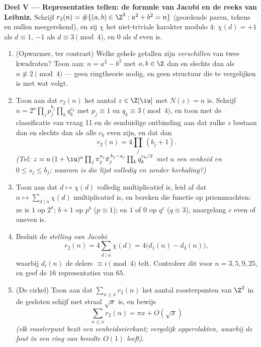 \begin{problem}
\medskip
\noindent\textbf{Deel V --- Representaties tellen: de formule van
Jacobi en de reeks van Leibniz.} Schrijf $r_2(n) = \#\{(a, b) \in
\Z^2 : a^2 + b^2 = n\}$ (geordende paren, tekens en nullen
meegerekend), en zij $\chi$ het niet-triviale karakter modulo $4$:
$\chi(d) = +1$ als $d \equiv 1$, $-1$ als $d \equiv 3 \pmod4$, en
$0$ als $d$ even is.
\begin{enumerate}[resume]
  \item (Opwarmer, ter contrast) Welke gehele getallen zijn
        \emph{verschillen} van twee kwadraten? Toon aan: $n = a^2 -
        b^2$ met $a, b \in \Z$ dan en slechts dan als $n
        \not\equiv 2 \pmod 4$ --- geen ringtheorie nodig, en geen
        structuur die te vergelijken is met wat volgt.
  \item Toon aan dat $r_2(n)$ het aantal $z \in \Z[\iu]$ met $N(z)
        = n$ is. Schrijf $n = 2^{a}\prod_jp_j^{b_j}
        \prod_kq_k^{c_k}$ met $p_j \equiv 1$ en $q_k \equiv 3
        \pmod4$, en toon met de classificatie van vraag 11 en de
        eenduidige ontbinding aan dat zulke $z$ bestaan dan en
        slechts dan als alle $c_k$ even zijn, en dat dan
        \[
        r_2(n) = 4\prod_j\,(b_j + 1) .
        \]
        \emph{(Tel: $z = u\,(1+\iu)^{a}\prod_j\pi_j^{s_j}
        \bar\pi_j^{\,b_j - s_j}\prod_kq_k^{c_k/2}$ met $u$ een
        eenheid en $0 \leq s_j \leq b_j$; waarom is die lijst
        volledig en zonder herhaling?)}
  \item Toon aan dat $d \mapsto \chi(d)$ volledig multiplicatief
        is, leid af dat $n \mapsto \sum_{d \mid n}\chi(d)$
        multiplicatief is, en bereken die functie op priemmachten:
        ze is $1$ op $2^a$; $b + 1$ op $p^b$ ($p \equiv 1$); en $1$
        of $0$ op $q^c$ ($q \equiv 3$), naargelang $c$ even of
        oneven is.
  \item Besluit de \emph{stelling van Jacobi}:
        \[
        r_2(n) = 4\sum_{d \mid n}\chi(d) =
        4\bigl(d_1(n) - d_3(n)\bigr),
        \]
        waarbij $d_i(n)$ de delers $\equiv i \pmod 4$ telt.
        Controleer dit voor $n = 3, 5, 9, 25$, en geef de $16$
        representaties van $65$.
  \item (De cirkel) Toon aan dat $\sum_{n \leq x}r_2(n)$ het aantal
        roosterpunten van $\Z^2$ in de gesloten schijf met straal
        $\sqrt x$ is, en bewijs
        \[
        \sum_{n\leq x}r_2(n) = \pi x + O(\sqrt x)
        \]
        \emph{(elk roosterpunt bezit een eenheidsvierkant;
        vergelijk oppervlakten, waarbij de fout in een ring van
        breedte $O(1)$ leeft)}.

\end{enumerate}
\end{problem}
